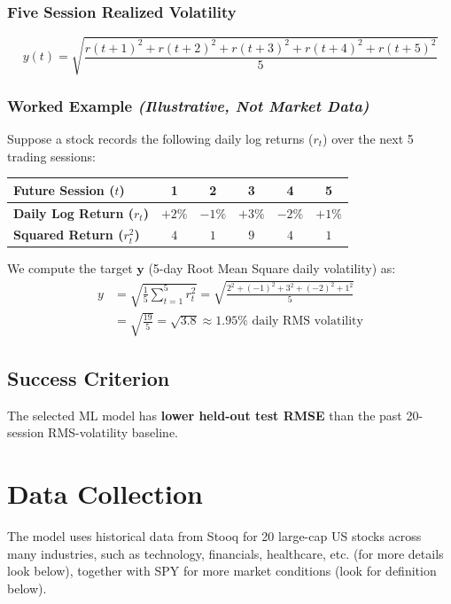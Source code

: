 \documentclass[11pt]{article}
\begin{document}
\subsubsection*{Five Session Realized Volatility}
\[
y(t) = \sqrt{ \frac{r(t+1)^2 + r(t+2)^2 + r(t+3)^2 + r(t+4)^2 + r(t+5)^2}{5} }
\]

\subsubsection*{Worked Example \textit{(Illustrative, Not Market Data)}}

Suppose a stock records the following daily log returns ($r_t$) over the next 5 trading sessions:

\begin{center}
\begin{tabular}{l|ccccc}
\hline
Future Session ($t$) & 1 & 2 & 3 & 4 & 5 \\
\hline
\textbf{Daily Log Return ($r_t$)} & $+2\%$ & $-1\%$ & $+3\%$ & $-2\%$ & $+1\%$ \\
\textbf{Squared Return ($r_t^2$)} & $4$ & $1$ & $9$ & $4$ & $1$ \\
\hline
\end{tabular}
\end{center}

We compute the target $\boldsymbol{y}$ (5-day Root Mean Square daily volatility) as:
\[
\begin{aligned}
y &= \sqrt{\frac{1}{5} \sum_{t=1}^{5} r_t^2} = \sqrt{\frac{2^2 + (-1)^2 + 3^2 + (-2)^2 + 1^2}{5}} \\
  &= \sqrt{\frac{19}{5}} = \sqrt{3.8} \approx \mathbf{1.95\%} \text{ daily RMS volatility}
\end{aligned}
\]

\subsection{Success Criterion}

The selected ML model has \textbf{lower held-out test RMSE} than the past 20-session RMS-volatility baseline.

\section{Data Collection}

The model uses historical data from Stooq for 20 large-cap US stocks across many industries, such as technology, financials, healthcare, etc. (for more details look below), together with SPY for more market conditions (look for definition below).
\end{document}
